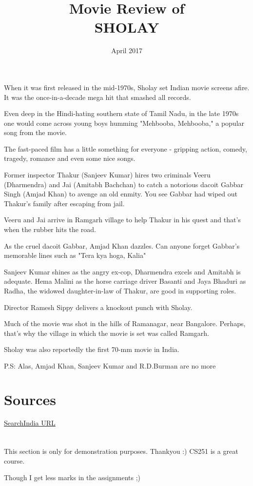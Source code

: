 \documentclass{article}
\title{Movie Review of\\\textsc{\LARGE{SHOLAY}}}
\date{April 2017}
\begin{document}
\maketitle

\section*{}

When it was first released in the mid-1970s, Sholay set Indian movie screens afire. It was the once-in-a-decade mega hit that smashed all records.

Even deep in the Hindi-hating southern state of Tamil Nadu, in the late 1970s one would come across young boys humming "Mehbooba, Mehbooba," a popular song from the movie.

The fast-paced film has a little something for everyone - gripping action, comedy, tragedy, romance and even some nice songs. 

Former inspector Thakur (Sanjeev Kumar) hires two criminals Veeru (Dharmendra) and Jai (Amitabh Bachchan) to catch a notorious dacoit Gabbar Singh (Amjad Khan) to avenge an old enmity. You see Gabbar had wiped out Thakur's family after escaping from jail.

Veeru and Jai arrive in Ramgarh village to help Thakur in his quest and that's when the rubber hits the road.

As the cruel dacoit Gabbar, Amjad Khan dazzles. Can anyone forget Gabbar's memorable lines such as "Tera kya hoga, Kalia"

Sanjeev Kumar shines as the angry ex-cop, Dharmendra excels and Amitabh is adequate. Hema Malini as the horse carriage driver Basanti and Jaya Bhaduri as Radha, the widowed daughter-in-law of Thakur, are good in supporting roles.

Director Ramesh Sippy delivers a knockout punch with Sholay.

Much of the movie was shot in the hills of Ramanagar, near Bangalore. Perhaps, that's why the village in which the movie is set was called Ramgarh.

Sholay was also reportedly the first 70-mm movie in India.

P.S: Alas, Amjad Khan, Sanjeev Kumar and R.D.Burman are no more

\section*{Sources}
\href{http://www.searchindia.com/search/bollywood-movies/sholay.html}{SearchIndia URL}

\section*{}

This section is only for demonstration purposes. Thankyou :)
CS251 is a great course.

Though I get less marks in the assignments ;)
\end{document}
